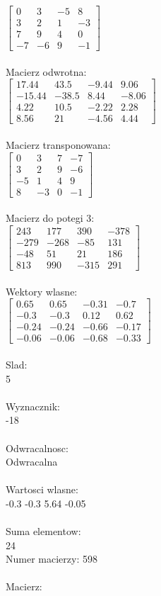 \documentclass[a4paper,12pt]{article}
\begin{document}
$\begin{bmatrix} 0&3&-5&8\\3&2&1&-3\\7&9&4&0\\-7&-6&9&-1 \end{bmatrix}$
\\
\\
Macierz odwrotna:\\

$\begin{bmatrix} 17.44&43.5&-9.44&9.06\\-15.44&-38.5&8.44&-8.06\\4.22&10.5&-2.22&2.28\\8.56&21&-4.56&4.44 \end{bmatrix}$
\\
\\
Macierz transponowana:\\

$\begin{bmatrix} 0&3&7&-7\\3&2&9&-6\\-5&1&4&9\\8&-3&0&-1 \end{bmatrix}$
\\
\\
Macierz do potegi 3:\\

$\begin{bmatrix} 243&177&390&-378\\-279&-268&-85&131\\-48&51&21&186\\813&990&-315&291 \end{bmatrix}$
\\
\\
Wektory wlasne:\\

$\begin{bmatrix} 0.65&0.65&-0.31&-0.7\\-0.3&-0.3&0.12&0.62\\-0.24&-0.24&-0.66&-0.17\\-0.06&-0.06&-0.68&-0.33 \end{bmatrix}$
\\
\\
Slad:\\
5
\\
\\
Wyznacznik:\\
-18
\\
\\
Odwracalnosc:\\
Odwracalna
\\
\\
Wartosci wlasne:\\
-0.3 -0.3 5.64 -0.05
\\
\\
Suma elementow:\\
24
\\
\newpage
Numer macierzy:
598
\\
\\
Macierz:\\
\end{document}
